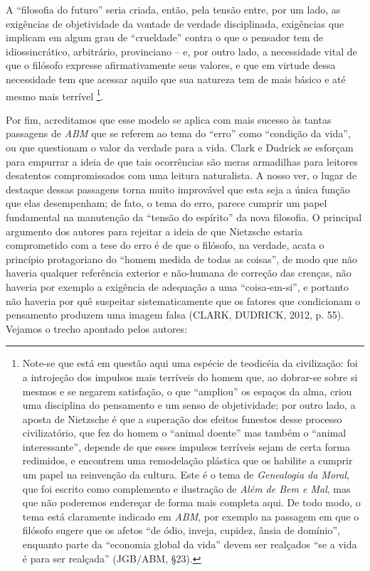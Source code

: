 \documentclass[
	12pt,				%
	openright,			%
	oneside,			%
	a4paper,			%
	english,			%
	french,				%
	spanish,			%
	brazil				%
	]{abntex2}
\begin{document}
	A “filosofia do futuro” seria criada, então, pela tensão entre, por um lado, as exigências de objetividade da vontade de verdade disciplinada, exigências que implicam em algum grau de “crueldade” contra o que o pensador tem de idiossincrático, arbitrário, provinciano – e, por outro lado, a necessidade vital de que o filósofo expresse afirmativamente seus valores, e que em virtude dessa necessidade tem que acessar aquilo que sua natureza tem de mais básico e até mesmo mais terrível
\footnote{Note-se que está em questão aqui uma espécie de teodicéia da civilização: foi a introjeção dos impulsos mais terríveis do homem que, ao dobrar-se sobre si mesmos e se negarem satisfação, o que “ampliou” os espaços da alma, criou uma disciplina do pensamento e um senso de objetividade; por outro lado, a aposta de Nietzsche é que a superação dos efeitos funestos desse processo civilizatório, que fez do homem o “animal doente” mas também o “animal  interessante”, depende de que esses impulsos terríveis sejam de certa forma redimidos, e encontrem uma remodelação plástica que os habilite a cumprir um papel na reinvenção da cultura. Este é o tema de \textit{Genealogia da Moral}, que foi escrito como complemento e ilustração de \textit{Além de Bem e Mal}, mas que não poderemos endereçar de forma mais completa aqui. De todo modo, o tema está claramente indicado em \textit{ABM}, por exemplo na passagem em que o filósofo sugere que os afetos “de ódio, inveja, cupidez, ânsia de domínio”, enquanto parte da “economia global da vida” devem ser realçados “se a vida é para ser realçada” (JGB/ABM, §23).}. 

Por fim, acreditamos que esse modelo se aplica com mais sucesso às tantas passagens de \textit{ABM} que se referem ao tema do “erro” como “condição da vida”, ou que questionam o valor da verdade para a vida. Clark e Dudrick se esforçam para empurrar a ideia de que tais ocorrências são meras armadilhas para leitores desatentos compromissados com uma leitura naturalista. A nosso ver, o lugar de destaque dessas passagens torna muito improvável que esta seja a única função que elas desempenham; de fato, o tema do erro, parece cumprir um papel fundamental na manutenção da “tensão do espírito” da nova filosofia. O principal argumento dos autores para rejeitar a ideia de que Nietzsche estaria comprometido com a tese do erro é de que o filósofo, na verdade, acata o princípio protagoriano do “homem medida de todas as coisas”, de modo que não haveria qualquer  referência exterior e não-humana de correção das crenças, não haveria por exemplo a exigência de adequação a uma “coisa-em-si”, e portanto não haveria por quê suspeitar sistematicamente que os fatores que condicionam o pensamento produzem uma imagem falsa (CLARK, DUDRICK, 2012, p. 55). Vejamos o trecho apontado pelos autores:
\end{document}
